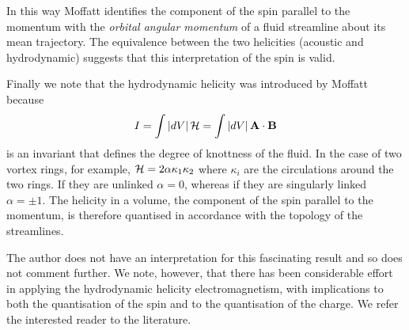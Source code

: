 \documentclass[10pt, fleqn,draft,showtrims,oldfontcommands]{article} %
\newcommand{\abs}[1]{\left| #1 \right|}
\newcommand{\vB}{\vect B}
\renewcommand{\H}{{\cal H}}
\newcommand{\vect}[1]{\mathbf{#1}}
\newcommand{\vu}{\textbf{u}}
\newcommand{\vA}{\textbf{A}}
\begin{document}
In this way Moffatt identifies the component of the spin parallel to the momentum
with the {\em orbital angular momentum} of a fluid streamline about its mean trajectory.
The equivalence between the two helicities (acoustic and hydrodynamic)
suggests that this interpretation of the spin is valid.

Finally we note that the hydrodynamic helicity was introduced by Moffatt because 
\begin{align}
  I = \int \abs{dV} \H = \int \abs{dV} \vA \cdot \vB
\end{align}
is an invariant that defines the degree of knottness of the fluid.
In the case of two vortex rings, for example, $\H =2 \alpha \kappa_1 \kappa_2$ 
where $\kappa_i$ are the circulations around the two rings. %
If they are unlinked $\alpha = 0$, whereas if they are singularly linked $\alpha = \pm 1$.
The helicity in a volume, the component of the spin parallel to the momentum, is therefore quantised
in accordance with the topology of the streamlines.

The author does not have an interpretation for this fascinating result and so does not comment further.
We note, however, that there has been considerable effort in applying the hydrodynamic helicity electromagnetism,
with implications to both the quantisation of the spin and to the quantisation of the charge.
We refer the interested reader to the literature\cite{Trueba1996, Trueba2000, Ranada2002}.




\end{document}
